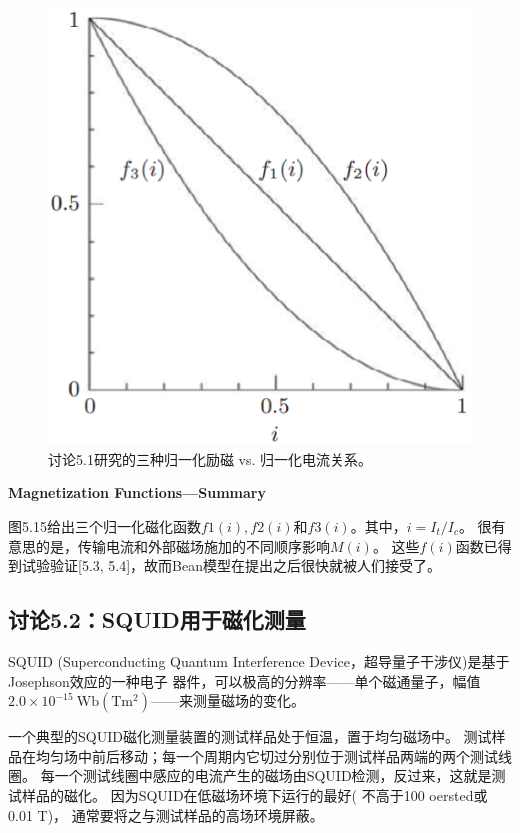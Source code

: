 \begin{figure}[htbp]
	\centering
	\includegraphics[scale=0.6]{chpt5/figs/fig5.15.eps}
	\caption{讨论5.1研究的三种归一化励磁 vs. 归一化电流关系。}
\end{figure}

\textbf{Magnetization Functions—Summary}

图5.15给出三个归一化磁化函数$f1(i), f2(i)$和$f3(i)$。其中，$i = I_t/I_c$。
很有意思的是，传输电流和外部磁场施加的不同顺序影响$M(i)$。
这些$f(i)$函数已得到试验验证[5.3, 5.4]，故而Bean模型在提出之后很快就被人们接受了。


\subsection{讨论5.2：SQUID用于磁化测量}
SQUID (Superconducting Quantum Interference Device，超导量子干涉仪)是基于Josephson效应的一种电子
器件，可以极高的分辨率——单个磁通量子，幅值$2.0\times 10^{−15}\ \mathrm{Wb(Tm^2)}$——来测量磁场的变化。

一个典型的SQUID磁化测量装置的测试样品处于恒温，置于均匀磁场中。
测试样品在均匀场中前后移动；每一个周期内它切过分别位于测试样品两端的两个测试线圈。
每一个测试线圈中感应的电流产生的磁场由SQUID检测，反过来，这就是测试样品的磁化。
因为SQUID在低磁场环境下运行的最好( 不高于100 oersted或0.01 T)，
通常要将之与测试样品的高场环境屏蔽。


